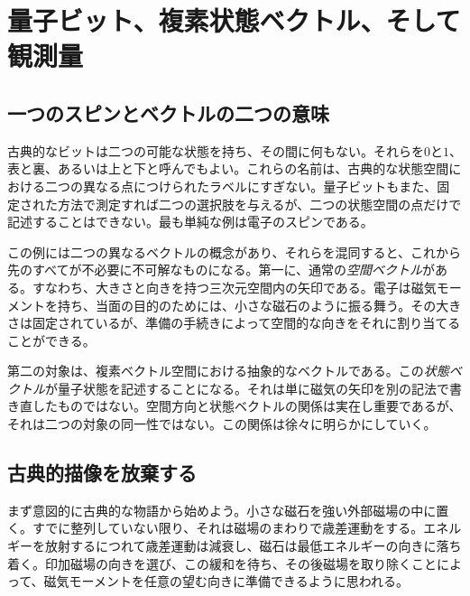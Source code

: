 \chapter{量子ビット、複素状態ベクトル、そして観測量}


\section{一つのスピンとベクトルの二つの意味}

古典的なビットは二つの可能な状態を持ち、その間に何もない。それらを\(0\)と\(1\)、表と裏、あるいは上と下と呼んでもよい。これらの名前は、古典的な状態空間における二つの異なる点につけられたラベルにすぎない。量子ビットもまた、固定された方法で測定すれば二つの選択肢を与えるが、二つの状態空間の点だけで記述することはできない。最も単純な例は電子のスピンである。

この例には二つの異なるベクトルの概念があり、それらを混同すると、これから先のすべてが不必要に不可解なものになる。第一に、通常の\emph{空間ベクトル}がある。すなわち、大きさと向きを持つ三次元空間内の矢印である。電子は磁気モーメントを持ち、当面の目的のためには、小さな磁石のように振る舞う。その大きさは固定されているが、準備の手続きによって空間的な向きをそれに割り当てることができる。

第二の対象は、複素ベクトル空間における抽象的なベクトルである。この\emph{状態ベクトル}が量子状態を記述することになる。それは単に磁気の矢印を別の記法で書き直したものではない。空間方向と状態ベクトルの関係は実在し重要であるが、それは二つの対象の同一性ではない。この関係は徐々に明らかにしていく。

\section{古典的描像を放棄する}

まず意図的に古典的な物語から始めよう。小さな磁石を強い外部磁場の中に置く。すでに整列していない限り、それは磁場のまわりで歳差運動をする。エネルギーを放射するにつれて歳差運動は減衰し、磁石は最低エネルギーの向きに落ち着く。印加磁場の向きを選び、この緩和を待ち、その後磁場を取り除くことによって、磁気モーメントを任意の望む向きに準備できるように思われる。

